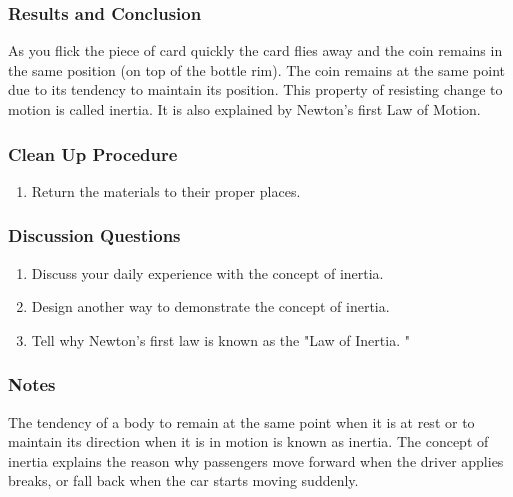 \subsubsection*{Results and Conclusion}
As you flick the piece of card quickly the card flies away and the coin remains in the same position (on top of the bottle rim). The coin remains at the same point due to its tendency to maintain its position. This property of resisting change to motion is called inertia. It is also explained by Newton's first Law of Motion.  

\subsubsection*{Clean Up Procedure}
\begin{enumerate}
\item{Return the materials to their proper places.} 
\end{enumerate}

\subsubsection*{Discussion Questions}
\begin{enumerate}
\item{Discuss your daily experience with the concept of inertia.} 
\item{Design another way to demonstrate the concept of inertia.} 
\item{Tell why Newton's first law is known as the "Law of Inertia.  "}
\end{enumerate}

\subsubsection*{Notes}
The tendency of a body to remain at the same point when it is at rest or to maintain its direction when it is in motion is known as inertia. The concept of inertia explains the reason why passengers move forward when the driver applies breaks, or fall back when the car starts moving suddenly.
